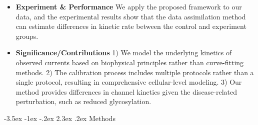 \documentclass[11pt]{article}
\makeatletter
\renewcommand\section{\@startsection {section}{1}{\z@}%
                                   {-3.5ex \@plus -1ex \@minus -.2ex}%
                                   {2.3ex \@plus.2ex}%
                                   {\normalfont\fontfamily{phv}\fontsize{16}{19}\bfseries}}
\makeatother
\begin{document}
\begin{itemize}
    \item \textbf{Experiment \& Performance} We apply the proposed framework to our data, and the experimental results show that the data assimilation method can estimate differences in kinetic rate between the control and experiment groups.
    \item \textbf{Significance/Contributions} 1) We model the underlying kinetics of observed currents based on biophysical principles rather than curve-fitting methods. 2) The calibration process includes multiple protocols rather than a single protocol, resulting in comprehensive cellular-level modeling. 3) Our method provides differences in channel kinetics given the disease-related perturbation, such as reduced glycosylation. 
\end{itemize}

\section{Methods} \label{s:methods}
\end{document}

